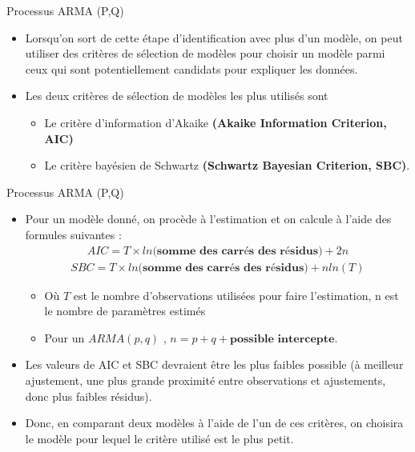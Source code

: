 \documentclass{beamer}
\begin{document}
\begin{frame}{Processus ARMA (P,Q)}
\begin{itemize}
\item Lorsqu’on sort de cette étape d’identification avec plus d’un modèle, on peut utiliser des critères de sélection de modèles pour choisir un modèle parmi ceux qui sont potentiellement candidats pour expliquer les données.
\item Les deux critères de sélection de modèles les plus utilisés sont
\begin{itemize}
\item Le critère d’information d’Akaike \textbf{(Akaike Information Criterion, AIC)}  
\item Le critère bayésien de Schwartz \textbf{(Schwartz Bayesian Criterion, SBC)}.

\end{itemize}
\end{itemize}
\end{frame}


\begin{frame}{Processus ARMA (P,Q)}
\begin{itemize}
\item Pour un modèle donné, on procède à l’estimation et on calcule à l’aide des formules suivantes :
\begin{align*}
AIC = T \times ln\textbf{(somme des carrés des résidus)} + 2n
\end{align*}
\begin{align*}
SBC = T \times ln\textbf{(somme des carrés des résidus)} + n ln(T)
\end{align*}
\begin{itemize}
\item Où $T$ est le nombre d’observations utilisées pour faire l’estimation, n est le nombre de paramètres estimés 
\item Pour un $ARMA(p,q)$ , $n = p + q+ \textbf{possible intercepte}$.
\end{itemize}
\item Les valeurs de AIC et SBC devraient être les plus faibles possible (à meilleur ajustement, une plus grande proximité entre observations et ajustements, donc plus faibles résidus). 
\item Donc, en comparant deux modèles à l’aide de l’un de ces critères, on choisira le modèle pour lequel le critère utilisé est le plus petit.
\end{itemize}
\end{frame}
\end{document}
